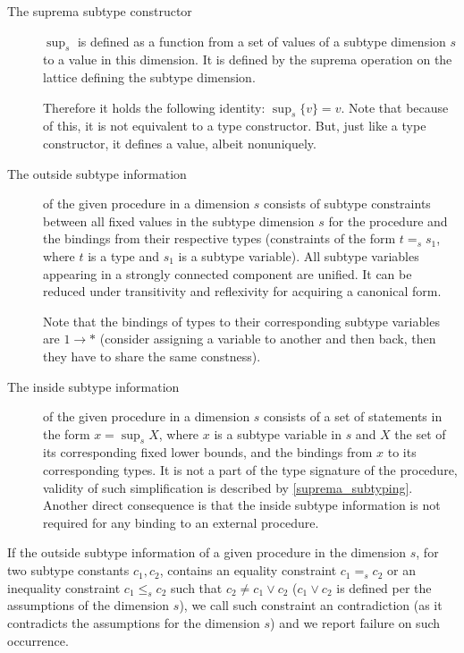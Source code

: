 \begin{description}
    \item[The suprema subtype constructor] $\sup_s$ is defined as a function from a set of values of a subtype dimension $s$ to a value in this dimension. It is defined by the suprema operation on the lattice defining the subtype dimension.

    Therefore it holds the following identity: $\sup_s \{v\} = v$. Note that because of this, it is not equivalent to a type constructor. But, just like a type constructor, it defines a value, albeit nonuniquely.

    \item[The outside subtype information] of the given procedure in a dimension $s$ consists of subtype constraints between all fixed values in the subtype dimension $s$ for the procedure and the bindings from their respective types (constraints of the form $t =_s s_1$, where $t$ is a type and $s_1$ is a subtype variable). All subtype variables appearing in a strongly connected component are unified. It can be reduced under transitivity and reflexivity for acquiring a canonical form.

    Note that the bindings of types to their corresponding subtype variables are $1 \to \ast$ (consider assigning a variable to another and then back, then they have to share the same constness).

    \item[The inside subtype information] of the given procedure in a dimension $s$ consists of a set of statements in the form $x = \sup_s X$, where $x$ is a subtype variable in $s$ and $X$ the set of its corresponding fixed lower bounds, and the bindings from $x$ to its corresponding types. It is not a part of the type signature of the procedure, validity of such simplification is described by \cref{suprema_subtyping}. Another direct consequence is that the inside subtype information is not required for any binding to an external procedure.
\end{description}

\begin{remark}
    \label{def:contra}
    If the outside subtype information of a given procedure in the dimension $s$, for two subtype constants $c_1, c_2$, contains an equality constraint $c_1 =_s c_2$ or an inequality constraint $c_1 \leq_s c_2$ such that $c_2 \neq c_1 \lor c_2$ ($c_1 \lor c_2$ is defined per the assumptions of the dimension $s$), we call such constraint an contradiction (as it contradicts the assumptions for the dimension $s$) and we report failure on such occurrence.
\end{remark}

